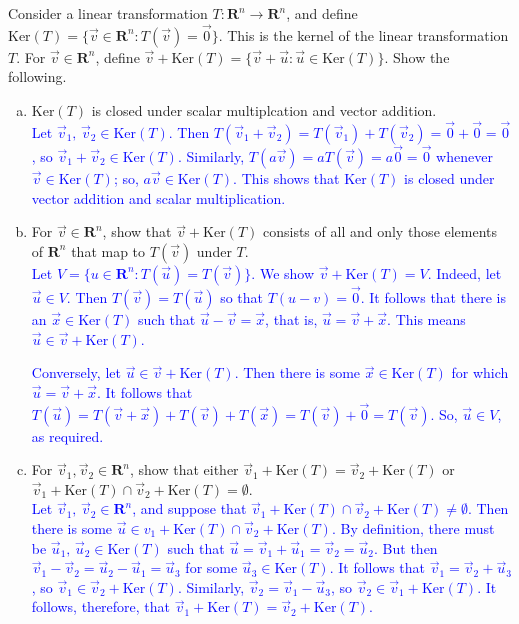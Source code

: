 \documentclass[a4paper,11pt]{article}
\newcommand{\R}{\mathbf{R}}
\newcommand{\BB}[1]{\textcolor{blue}{#1}}
\begin{document}
 Consider a linear transformation $T: \R^n
\rightarrow \R^n$, and define $\text{Ker}(T)=\{\vec v \in \R^n : T(\vec v)=\vec
0\}$. This is the kernel of the linear transformation $T$. For $\vec v \in
\R^n$, define $\vec v + \text{Ker}(T)=\{\vec v + \vec u : \vec u \in
\text{Ker}(T)\}$. Show the following.
\begin{enumerate}[(a)]
\item $\text{Ker}(T)$ is closed under scalar multiplcation and vector addition.\\

  \BB{Let $\vec v_1,\,\vec v_2 \in \text{Ker}(T)$. Then $T(\vec v_1+\vec
    v_2)=T(\vec v_1)+T(\vec v_2)=\vec 0+\vec 0=\vec 0$, so $\vec v_1+\vec v_2
    \in \text{Ker}(T)$. Similarly, $T(a\vec v)=aT(\vec v)=a\vec 0=\vec 0$
    whenever $\vec v \in \text{Ker}(T)$; so, $a\vec v \in \text{Ker}(T)$. This
    shows that $\text{Ker}(T)$ is closed under vector addition and scalar
    multiplication. \\}
  
\item For $\vec v \in \R^n$, show that $\vec v + \text{Ker}(T)$ consists of all
  and only those elements of $\R^n$ that map to $T(\vec v)$ under $T$. \\

  \BB{Let $V=\{u \in \R^n : T(\vec u)=T(\vec v)\}$. We show $\vec
    v+\text{Ker}(T)=V$. Indeed, let $\vec u \in V$. Then $T(\vec v)=T(\vec u)$
    so that $T(u-v)=\vec 0$. It follows that there is an $\vec x \in
    \text{Ker}(T)$ such that $\vec u-\vec v=\vec x$, that is, $\vec u=\vec
    v+\vec x$. This means $\vec u \in \vec v+\text{Ker}(T)$.}

  \BB{Conversely, let $\vec u \in \vec v+\text{Ker}(T)$. Then there is some
    $\vec x \in \text{Ker}(T)$ for which $\vec u=\vec v+\vec x.$ It follows that
  $T(\vec u)=T(\vec v+\vec x)+T(\vec v)+T(\vec x)=T(\vec v)+\vec 0=T(\vec v)$.
  So, $\vec u \in V$, as required. \\}

\item For $\vec v_1,\vec v_2 \in \R^n$, show that either $\vec
  v_1+\text{Ker}(T)=\vec v_2 +\text{Ker}(T)$ or $\vec v_1+\text{Ker}(T) \cap
  \vec v_2 +\text{Ker}(T)=\emptyset$. \\

  \BB{Let $\vec v_1,\,\vec v_2 \in \R^n$, and suppose that $\vec
    v_1+\text{Ker}(T) \cap \vec v_2+\text{Ker}(T) \neq \emptyset$. Then there is
    some $\vec u \in v_1+\text{Ker}(T) \cap \vec v_2+\text{Ker}(T)$. By
    definition, there must be $\vec u_1,\,\vec u_2 \in \text{Ker}(T)$ such that
    $\vec u=\vec v_1+\vec u_1=\vec v_2=\vec u_2$. But then $\vec v_1-\vec
    v_2=\vec u_2-\vec u_1=\vec u_3$ for some $\vec u_3 \in \text{Ker}(T)$. It
    follows that $\vec v_1=\vec v_2+\vec u_3$, so $\vec v_1 \in \vec
    v_2+\text{Ker}(T)$. Similarly, $\vec v_2=\vec v_1-\vec u_3$, so $\vec v_2 \in
    \vec v_1+\text{Ker}(T)$. It follows, therefore, that $\vec
    v_1+\text{Ker}(T)=\vec v_2+\text{Ker}(T)$.}
\end{enumerate}
\end{document}
